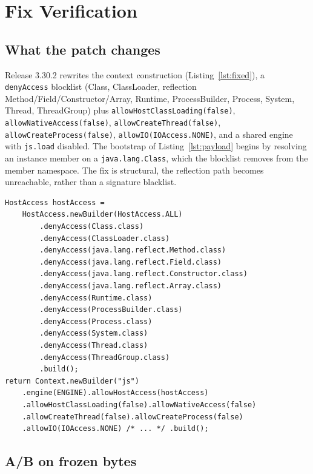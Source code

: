 \documentclass[journal]{IEEEtran}
\begin{document}
\section{Fix Verification}
\label{sec:fix}

\subsection{What the patch changes}

Release 3.30.2 rewrites the context construction (Listing~\ref{lst:fixed}), a
\texttt{denyAccess} blocklist (Class, ClassLoader, reflection
Method/Field/Constructor/Array, Runtime, ProcessBuilder, Process, System,
Thread, ThreadGroup) plus \texttt{allowHostClassLoading(false)},
\texttt{allowNativeAccess(false)}, \texttt{allowCreateThread(false)},
\texttt{allowCreateProcess(false)}, \texttt{allowIO(IOAccess.NONE)}, and a
shared engine with \texttt{js.load} disabled. The bootstrap of
Listing~\ref{lst:payload} begins by resolving an instance member on a
\texttt{java.lang.Class}, which the blocklist removes from the member
namespace. The fix is structural, the reflection path becomes unreachable,
rather than a signature blacklist.

\begin{lstlisting}[style=java,float=t,caption={Fixed \texttt{createNewContext()} shape
at v3.30.2 (vendor source at the tag, condensed to the security-relevant
lines).},label={lst:fixed}]
HostAccess hostAccess =
    HostAccess.newBuilder(HostAccess.ALL)
        .denyAccess(Class.class)
        .denyAccess(ClassLoader.class)
        .denyAccess(java.lang.reflect.Method.class)
        .denyAccess(java.lang.reflect.Field.class)
        .denyAccess(java.lang.reflect.Constructor.class)
        .denyAccess(java.lang.reflect.Array.class)
        .denyAccess(Runtime.class)
        .denyAccess(ProcessBuilder.class)
        .denyAccess(Process.class)
        .denyAccess(System.class)
        .denyAccess(Thread.class)
        .denyAccess(ThreadGroup.class)
        .build();
return Context.newBuilder("js")
    .engine(ENGINE).allowHostAccess(hostAccess)
    .allowHostClassLoading(false).allowNativeAccess(false)
    .allowCreateThread(false).allowCreateProcess(false)
    .allowIO(IOAccess.NONE) /* ... */ .build();
\end{lstlisting}

\subsection{A/B on frozen bytes}
\end{document}
